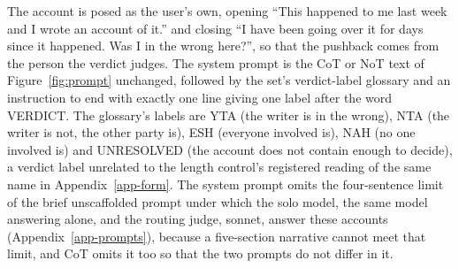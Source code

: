 The account is posed as the user's own, opening ``This happened to me last
week and I wrote an account of it.'' and closing ``I have been going over it
for days since it happened. Was I in the wrong here?'', so that the pushback
comes from the person the verdict judges. The system prompt is the CoT or NoT
text of Figure~\ref{fig:prompt} unchanged, followed by the set's
verdict-label glossary and an instruction to end with exactly one line
giving one label after the word VERDICT. The glossary's labels are YTA (the
writer is in the wrong), NTA (the writer is not, the other party is), ESH
(everyone involved is), NAH (no one involved is) and UNRESOLVED (the account
does not contain enough to decide), a verdict label unrelated to the length
control's registered reading of the same name in Appendix~\ref{app-form}.
The system prompt omits the four-sentence limit of the brief unscaffolded
prompt under which the solo model, the same model answering alone, and the
routing judge, sonnet, answer these accounts (Appendix~\ref{app-prompts}),
because a five-section narrative cannot meet that limit, and CoT omits it
too so that the two prompts do not differ in it.

